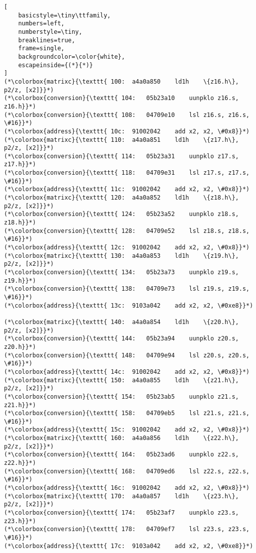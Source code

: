 \documentclass[a4paper,10pt]{article}
\begin{document}
\begin{lstlisting}[
    basicstyle=\tiny\ttfamily,
    numbers=left,
    numberstyle=\tiny,
    breaklines=true,
    frame=single,
    backgroundcolor=\color{white},
    escapeinside={(*}{*)}
]
(*\colorbox{matrixc}{\texttt{ 100:	a4a0a850 	ld1h	\{z16.h\}, p2/z, [x2]}}*)
(*\colorbox{conversion}{\texttt{ 104:	05b23a10 	uunpklo	z16.s, z16.h}}*)
(*\colorbox{conversion}{\texttt{ 108:	04709e10 	lsl	z16.s, z16.s, \#16}}*)
(*\colorbox{address}{\texttt{ 10c:	91002042 	add	x2, x2, \#0x8}}*)
(*\colorbox{matrixc}{\texttt{ 110:	a4a0a851 	ld1h	\{z17.h\}, p2/z, [x2]}}*)
(*\colorbox{conversion}{\texttt{ 114:	05b23a31 	uunpklo	z17.s, z17.h}}*)
(*\colorbox{conversion}{\texttt{ 118:	04709e31 	lsl	z17.s, z17.s, \#16}}*)
(*\colorbox{address}{\texttt{ 11c:	91002042 	add	x2, x2, \#0x8}}*)
(*\colorbox{matrixc}{\texttt{ 120:	a4a0a852 	ld1h	\{z18.h\}, p2/z, [x2]}}*)
(*\colorbox{conversion}{\texttt{ 124:	05b23a52 	uunpklo	z18.s, z18.h}}*)
(*\colorbox{conversion}{\texttt{ 128:	04709e52 	lsl	z18.s, z18.s, \#16}}*)
(*\colorbox{address}{\texttt{ 12c:	91002042 	add	x2, x2, \#0x8}}*)
(*\colorbox{matrixc}{\texttt{ 130:	a4a0a853 	ld1h	\{z19.h\}, p2/z, [x2]}}*)
(*\colorbox{conversion}{\texttt{ 134:	05b23a73 	uunpklo	z19.s, z19.h}}*)
(*\colorbox{conversion}{\texttt{ 138:	04709e73 	lsl	z19.s, z19.s, \#16}}*)
(*\colorbox{address}{\texttt{ 13c:	9103a042 	add	x2, x2, \#0xe8}}*)

(*\colorbox{matrixc}{\texttt{ 140:	a4a0a854 	ld1h	\{z20.h\}, p2/z, [x2]}}*)
(*\colorbox{conversion}{\texttt{ 144:	05b23a94 	uunpklo	z20.s, z20.h}}*)
(*\colorbox{conversion}{\texttt{ 148:	04709e94 	lsl	z20.s, z20.s, \#16}}*)
(*\colorbox{address}{\texttt{ 14c:	91002042 	add	x2, x2, \#0x8}}*)
(*\colorbox{matrixc}{\texttt{ 150:	a4a0a855 	ld1h	\{z21.h\}, p2/z, [x2]}}*)
(*\colorbox{conversion}{\texttt{ 154:	05b23ab5 	uunpklo	z21.s, z21.h}}*)
(*\colorbox{conversion}{\texttt{ 158:	04709eb5 	lsl	z21.s, z21.s, \#16}}*)
(*\colorbox{address}{\texttt{ 15c:	91002042 	add	x2, x2, \#0x8}}*)
(*\colorbox{matrixc}{\texttt{ 160:	a4a0a856 	ld1h	\{z22.h\}, p2/z, [x2]}}*)
(*\colorbox{conversion}{\texttt{ 164:	05b23ad6 	uunpklo	z22.s, z22.h}}*)
(*\colorbox{conversion}{\texttt{ 168:	04709ed6 	lsl	z22.s, z22.s, \#16}}*)
(*\colorbox{address}{\texttt{ 16c:	91002042 	add	x2, x2, \#0x8}}*)
(*\colorbox{matrixc}{\texttt{ 170:	a4a0a857 	ld1h	\{z23.h\}, p2/z, [x2]}}*)
(*\colorbox{conversion}{\texttt{ 174:	05b23af7 	uunpklo	z23.s, z23.h}}*)
(*\colorbox{conversion}{\texttt{ 178:	04709ef7 	lsl	z23.s, z23.s, \#16}}*)
(*\colorbox{address}{\texttt{ 17c:	9103a042 	add	x2, x2, \#0xe8}}*)


\end{lstlisting}
\end{document}
